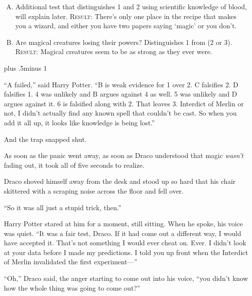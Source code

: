 \begin{centering}
\begin{samepage}
\begin{enumerate}[A.]{
                \firmlist
                \setlength{\leftmargin}{\parindent}
                \setlength{\rightmargin}{1cm}}
        \item Additional test that distinguishes 1 and 2 using scientific knowledge of blood, will explain later. {\scshape Result:} There’s only one place in the recipe that makes you a wizard, and either you have two papers saying ‘magic’ or you don’t.

        \item Are magical creatures losing their powers? Distinguishes 1 from (2 or 3). {\scshape Result:} Magical creatures seem to be as strong as they ever were.
        \end{enumerate}
\end{samepage}
\end{centering}
\baselineskip plus .5\textheight minus 1\baselineskip
\restoretrivseps

“A failed,” said Harry Potter. “B is weak evidence for 1 over 2. C falsifies 2.
D falsifies 1. 4 was unlikely and B argues against 4 as well. 5 was unlikely
and D argues against it. 6 is falsified along with 2. That leaves 3. Interdict
of Merlin or not, I didn’t actually find any known spell that couldn’t be cast.
So when you add it all up, it looks like knowledge is being lost.”

And the trap snapped shut.

As soon as the panic went away, as soon as Draco understood that magic
\emph{wasn’t} fading out, it took all of five seconds to realize.

Draco shoved himself away from the desk and stood up so hard that his chair
skittered with a scraping noise across the floor and fell over.

“So it was all just a stupid trick, then.”

Harry Potter stared at him for a moment, still sitting. When he spoke, his
voice was quiet. “It was a fair test, Draco. If it had come out a different
way, I would have accepted it. That’s not something I would ever cheat on.
Ever. I didn’t look at your data before I made my predictions. I told you up
front when the Interdict of Merlin invalidated the first experiment—”

“Oh,” Draco said, the anger starting to come out into his voice, “you didn’t
know how the whole thing was going to come out?”

